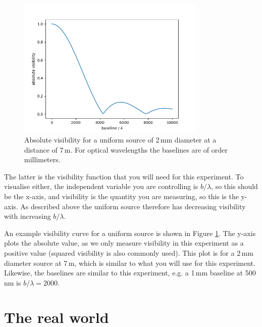 \documentclass[11pt]{article}
\begin{document}
\begin{figure}
    \centering
    \includegraphics[width=0.8\textwidth]{doc/uniform_vis.png}
    \caption{Absolute visibility for a uniform source of 2\,mm diameter at a distance of 7\,m. For optical wavelengths the baselines are of order millimeters.}
    \label{fig:uniformvis}
\end{figure}

The latter is the visibility function that you will need for this experiment. To visualise either, the independent variable you are controlling is $b/\lambda$, so this should be the x-axis, and visibility is the quantity you are measuring, so this is the y-axis. As described above the uniform source therefore has decreasing visibility with increasing $b/\lambda$.

An example visibility curve for a uniform source is shown in Figure \ref{fig:uniformvis}. The y-axis plots the absolute value, as we only measure visibility in this experiment as a positive value (squared visibility is also commonly used). This plot is for a 2\,mm diameter source at 7\,m, which is similar to what you will use for this experiment. Likewise, the baselines are similar to this experiment, e.g. a 1\,mm baseline at 500\,nm is $b/\lambda=2000$.

\clearpage
\section{The real world}
\end{document}
